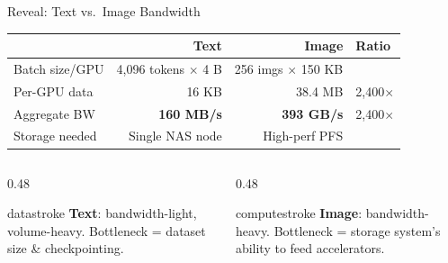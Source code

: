\documentclass[aspectratio=169, 12pt]{beamer}
\begin{document}
\begin{frame}{Reveal: Text vs.\ Image Bandwidth}

\small
\renewcommand{\arraystretch}{1.2}
{\footnotesize
\begin{tabular}{@{}lrrl@{}}
  \toprule
  & \textbf{Text} & \textbf{Image} & \textbf{Ratio} \\
  \midrule
  Batch size/GPU    & 4,096 tokens $\times$ 4 B & 256 imgs $\times$ 150 KB & \\
  Per-GPU data      & 16 KB                      & 38.4 MB                  & 2,400$\times$ \\
  Aggregate BW      & \textbf{160 MB/s}          & \textbf{393 GB/s}        & 2,400$\times$ \\
  \midrule
  Storage needed    & Single NAS node            & High-perf PFS            & \\
  \bottomrule
\end{tabular}
}

\vspace{0.15cm}
\begin{columns}[T]
  \begin{column}{0.48\textwidth}
    \begin{mlsyscard}{datastroke}
    {\footnotesize \textbf{Text}: bandwidth-light, volume-heavy. Bottleneck = dataset size \& checkpointing.}
    \end{mlsyscard}
  \end{column}
  \begin{column}{0.48\textwidth}
    \begin{mlsyscard}{computestroke}
    {\footnotesize \textbf{Image}: bandwidth-heavy. Bottleneck = storage system's ability to feed accelerators.}
    \end{mlsyscard}
  \end{column}
\end{columns}

\end{frame}
\end{document}
